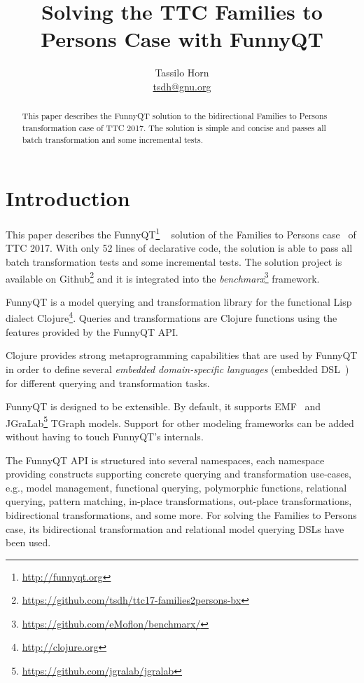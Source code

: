 \documentclass[a4paper]{article}
\title{Solving the TTC Families to Persons Case with FunnyQT}
\author{Tassilo Horn\\ \href{mailto:tsdh@gnu.org}{tsdh@gnu.org}}
\begin{document}
\maketitle

\begin{abstract}
  This paper describes the FunnyQT solution to the bidirectional Families to
  Persons transformation case of TTC 2017.  The solution is simple and concise
  and passes all batch transformation and some incremental tests.
\end{abstract}


\section{Introduction}
\label{sec:introduction}

This paper describes the FunnyQT\footnote{\url{http://funnyqt.org}}
~\cite{diss,funnyqt-icgt15} solution of the Families to Persons
case~\cite{f2p-case-desc} of TTC 2017.  With only 52 lines of declarative code,
the solution is able to pass all batch transformation tests and some
incremental tests.  The solution project is available on
Github\footnote{\url{https://github.com/tsdh/ttc17-families2persons-bx}} and it
is integrated into the
\emph{benchmarx}\footnote{\url{https://github.com/eMoflon/benchmarx/}}
framework.

FunnyQT is a model querying and transformation library for the functional Lisp
dialect Clojure\footnote{\url{http://clojure.org}}.  Queries and
transformations are Clojure functions using the features provided by the
FunnyQT API.

Clojure provides strong metaprogramming capabilities that are used by FunnyQT
in order to define several \emph{embedded domain-specific languages} (embedded
DSL~\cite{book:Fowler2010DSL}) for different querying and transformation tasks.

FunnyQT is designed to be extensible.  By default, it supports
EMF~\cite{Steinberg2008EEM} and
JGraLab\footnote{\url{https://github.com/jgralab/jgralab}} TGraph models.
Support for other modeling frameworks can be added without having to touch
FunnyQT's internals.

The FunnyQT API is structured into several namespaces, each namespace providing
constructs supporting concrete querying and transformation use-cases, e.g.,
model management, functional querying, polymorphic functions, relational
querying, pattern matching, in-place transformations, out-place
transformations, bidirectional transformations, and some more.  For solving the
Families to Persons case, its bidirectional transformation and relational model
querying DSLs have been used.
\end{document}
